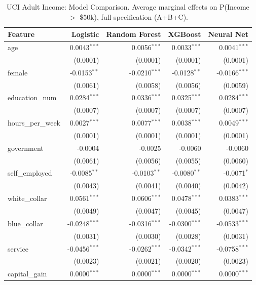 \documentclass[12pt,a4paper]{article}
\numberwithin{equation}{section}
\theoremstyle{plain}
\theoremstyle{definition}
\begin{document}
	\begin{table}[htbp]
		\centering
		\small
		\begin{threeparttable}
			\caption{UCI Adult Income: Model Comparison. Average marginal effects on P(Income $>$ \$50k), full specification (A+B+C).}
			\label{tab:adult_model_comparison}
			\begin{tabular}{lrrrr}
				\toprule
				Feature & Logistic & Random Forest & XGBoost & Neural Net \\
				\midrule
				age & 0.0043$^{***}$ & 0.0056$^{***}$ & 0.0033$^{***}$ & 0.0041$^{***}$ \\
				& (0.0001) & (0.0001) & (0.0001) & (0.0001) \\
				female & -0.0153$^{**}$ & -0.0210$^{***}$ & -0.0128$^{**}$ & -0.0166$^{***}$ \\
				& (0.0061) & (0.0058) & (0.0056) & (0.0059) \\
				education\_num & 0.0284$^{***}$ & 0.0336$^{***}$ & 0.0325$^{***}$ & 0.0284$^{***}$ \\
				& (0.0007) & (0.0007) & (0.0007) & (0.0007) \\
				\midrule
				hours\_per\_week & 0.0027$^{***}$ & 0.0077$^{***}$ & 0.0038$^{***}$ & 0.0049$^{***}$ \\
				& (0.0001) & (0.0001) & (0.0001) & (0.0001) \\
				government & -0.0004 & -0.0025 & -0.0060 & -0.0060 \\
				& (0.0061) & (0.0056) & (0.0055) & (0.0060) \\
				self\_employed & -0.0085$^{**}$ & -0.0103$^{**}$ & -0.0080$^{**}$ & -0.0071$^{*}$ \\
				& (0.0043) & (0.0041) & (0.0040) & (0.0042) \\
				white\_collar & 0.0561$^{***}$ & 0.0606$^{***}$ & 0.0478$^{***}$ & 0.0383$^{***}$ \\
				& (0.0049) & (0.0047) & (0.0045) & (0.0047) \\
				blue\_collar & -0.0248$^{***}$ & -0.0316$^{***}$ & -0.0300$^{***}$ & -0.0533$^{***}$ \\
				& (0.0031) & (0.0030) & (0.0028) & (0.0031) \\
				service & -0.0456$^{***}$ & -0.0262$^{***}$ & -0.0342$^{***}$ & -0.0758$^{***}$ \\
				& (0.0023) & (0.0021) & (0.0020) & (0.0023) \\
				\midrule
				capital\_gain & 0.0000$^{***}$ & 0.0000$^{***}$ & 0.0000$^{***}$ & 0.0000$^{***}$ \\

\end{tabular}
\end{threeparttable}
\end{table}
\end{document}
